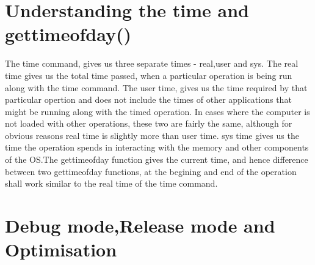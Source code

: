 \documentclass[11pt]{article}
\begin{document}
\section*{Understanding the time and gettimeofday() }
The time command, gives us three separate times - real,user and sys. The real time gives us the total time passed, when a particular operation is being run along with the time command. The user time, gives us the time required by that particular opertion and does not include the times of other applications that might be running along with the timed operation. In cases where the computer is not loaded with other operations, these two are fairly the same, although for obvious reasons real time is slightly more than user time. sys time gives us the time the operation spends in interacting with the memory and other components of the OS.\newline The gettimeofday function gives the current time, and hence difference between two gettimeofday functions, at the begining and end of the operation shall work similar to the real time of the time command.

\section*{Debug mode,Release mode and Optimisation}
\end{document}
